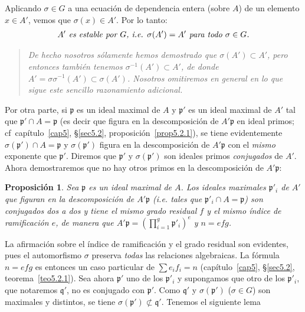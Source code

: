 \documentclass[bibtotoc,leqno,spanish]{amsbook}
\newcommand{\idl}[1]{\mathfrak{#1}}
\numberwithin{equation}{section}
\newenvironment{comm}%
	{\begin{quotation}\itshape}
	{\end{quotation}}
\theoremstyle{note}
\theoremstyle{note}
\newtheorem{proposition}{Proposici\'on}
\theoremstyle{rem}
\numberwithin{theorem}{section}
\numberwithin{proposition}{section}
\numberwithin{definition}{section}
\numberwithin{lemma}{section}
\numberwithin{corollary}{section}
\numberwithin{example}{section}
\numberwithin{footnote}{section}%
\begin{document}
Aplicando $\sigma\in G$ a una ecuaci\'on de dependencia entera (sobre $A$) de un elemento $x\in A'$, vemos
que $\sigma(x)\in A'$. Por lo tanto:
\begin{gather}\label{eq6.2.1}
\text{\itshape $A'$ es estable por $G$, i.e. $\sigma(A')=A'$ para todo $\sigma\in G$.}
\end{gather}

\begin{comm}
De hecho nosotros s\'olamente hemos demostrado que $\sigma(A')\subset A'$, pero entonces tambi\'en
tenemos $\sigma^{-1}(A')\subset A'$, de donde $A'=\sigma\sigma^{-1}(A')\subset\sigma(A')$. Nosotros
omitiremos en general en lo que sigue este sencillo razonamiento adicional.
\end{comm}

Por otra parte, si $\idl{p}$ es un ideal maximal de $A$ y $\idl{p}'$ es un ideal maximal de $A'$ tal que
$\idl{p}'\cap A=\idl{p}$ (es decir que figura en la descomposici\'on de $A'\idl{p}$ en ideal primos;
cf~cap\'itulo~\ref{cap5}, \S\ref{sec5.2}, proposici\'on~\ref{prop5.2.1}),
se tiene evidentemente $\sigma(\idl{p}')\cap A=\idl{p}$ y
$\sigma(\idl{p}')$ figura en la descomposici\'on de $A'\idl{p}$ con el {\em mismo} exponente que $\idl{p}'$.
Diremos que $\idl{p}'$ y $\sigma(\idl{p}')$ son ideales primos {\em conjugados} de $A'$. Ahora demostraremos
que no hay otros primos en la descomposici\'on de $A'\idl{p}$:

\begin{proposition}\label{prop6.2.1}
Sea $\idl{p}$ es un ideal maximal de $A$. Los ideales maximales $\idl{p}'_{i}$ de $A'$ que figuran en
la descomposici\'on de $A'\idl{p}$ (i.e. tales que $\idl{p}'_{i}\cap A=\idl{p}$) son conjugados dos a dos
y tiene el mismo grado residual $f$ y el mismo \'indice de ramificaci\'on $e$, de manera que
$A'\idl{p} = \left(\prod_{i=1}^{g}\idl{p}'_{i}\right)^{e}$ y $n=efg$.
\end{proposition}

La afirmaci\'on sobre el \'indice de ramificaci\'on y el grado residual son evidentes, pues el automorfismo
$\sigma$ preserva {\em todas} las relaciones algebraicas. La f\'ormula $n=efg$ es entonces un caso particular
de $\sum e_{i}f_{i}=n$ (cap\'itulo~\ref{cap5}, \S\ref{sec5.2}, teorema~\ref{teo5.2.1}). Sea ahora $\idl{p}'$ uno de los $\idl{p}'_{i}$
y supongamos que otro de los $\idl{p}'_{i}$, que notaremos $\idl{q}'$, no es conjugado con $\idl{p}'$.
Como $\idl{q}'$ y $\sigma(\idl{p}')$ ($\sigma\in G$) son maximales y distintos, se tiene $\sigma(\idl{p}')\not\subset\idl{q}'$.
Tenemos el siguiente lema
\end{document}
